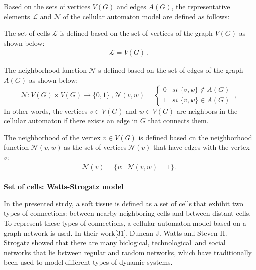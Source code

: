 \documentclass[a4paper,11pt]{article}
\begin{document}
{Based on the sets of vertices $V(G)$ and edges $A(G)$, the representative elements $\mathcal{L}$ and $\mathcal{N}$ of the cellular automaton model are defined as follows:

The set of cells $\mathcal{L}$ is defined based on the set of vertices of the graph $V(G)$ as shown below:
\begin{align}
\boxed{\mathcal{L} = V(G)}~. \label{eq-L}
\end{align}

The neighborhood function $\mathcal{N}$ s defined based on the set of edges of the graph $A(G)$ as shown below:
\begin{subequations}
\begin{equation}
\boxed{\mathcal{N} : V(G) \times V(G) \rightarrow \lbrace 0,1 \rbrace}~, \label{eq-N}
\end{equation}
\begin{equation}
\boxed{\mathcal{N}(v,w) = \left\lbrace
	\begin{array}{lr}
		0& \textit{si } \lbrace v,w \rbrace \notin A(G)\\
		1& \textit{si } \lbrace v,w \rbrace \in A(G)
	\end{array}
\right.}~, \label{eq-N-2}
\end{equation}
\end{subequations}
In other words, the vertices $v \in V(G)$ and $w \in V(G)$  are neighbors in the cellular automaton if there exists an edge in $G$ that connects them.

The neighborhood of the vertex $v \in V(G)$ is defined based on the neighborhood function $\mathcal{N}(v,w)$   as the set of vertices $\mathcal{N}(v)$  that have edges with the vertex $v$:
\begin{align} 
\mathcal{N}(v) = \lbrace w~|~\mathcal{N}(v,w)=1 \rbrace. \label{eq-neighbourhood}
\end{align}
\\
\textbf{Set of cells: Watts-Strogatz model}

In the presented study, a soft tissue is defined as a set of cells that exhibit two types of connections: between nearby neighboring cells and between distant cells. To represent these types of connections, a cellular automaton model based on a graph network is used. In their work[31], Duncan J. Watts and Steven H. Strogatz showed that there are many biological, technological, and social networks that lie between regular and random networks, which have traditionally been used to model different types of dynamic systems.

}
\end{document}
